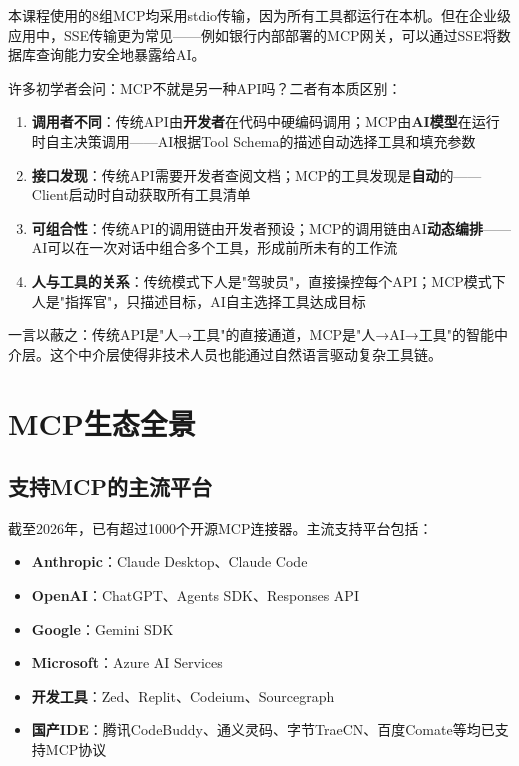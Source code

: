 本课程使用的8组MCP均采用stdio传输，因为所有工具都运行在本机。但在企业级应用中，SSE传输更为常见——例如银行内部部署的MCP网关，可以通过SSE将数据库查询能力安全地暴露给AI。

\begin{theorybox}[MCP与传统API调用的本质区别]
许多初学者会问：MCP不就是另一种API吗？二者有本质区别：

\begin{enumerate}[leftmargin=2em]
  \item \textbf{调用者不同}：传统API由\textbf{开发者}在代码中硬编码调用；MCP由\textbf{AI模型}在运行时自主决策调用——AI根据Tool Schema的描述自动选择工具和填充参数
  \item \textbf{接口发现}：传统API需要开发者查阅文档；MCP的工具发现是\textbf{自动}的——Client启动时自动获取所有工具清单
  \item \textbf{可组合性}：传统API的调用链由开发者预设；MCP的调用链由AI\textbf{动态编排}——AI可以在一次对话中组合多个工具，形成前所未有的工作流
  \item \textbf{人与工具的关系}：传统模式下人是"驾驶员"，直接操控每个API；MCP模式下人是"指挥官"，只描述目标，AI自主选择工具达成目标
\end{enumerate}

一言以蔽之：传统API是"人→工具"的直接通道，MCP是"人→AI→工具"的智能中介层。这个中介层使得非技术人员也能通过自然语言驱动复杂工具链。
\end{theorybox}

\section{MCP生态全景}

\subsection{支持MCP的主流平台}

截至2026年，已有超过1000个开源MCP连接器。主流支持平台包括：

\begin{itemize}[leftmargin=2em]
  \item \textbf{Anthropic}：Claude Desktop、Claude Code
  \item \textbf{OpenAI}：ChatGPT、Agents SDK、Responses API
  \item \textbf{Google}：Gemini SDK
  \item \textbf{Microsoft}：Azure AI Services
  \item \textbf{开发工具}：Zed、Replit、Codeium、Sourcegraph
  \item \textbf{国产IDE}：腾讯CodeBuddy、通义灵码、字节TraeCN、百度Comate等均已支持MCP协议
\end{itemize}

